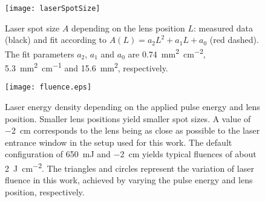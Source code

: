 \begin{figure}
    \centering
    \texttt{[image: laserSpotSize]}
    \caption{
        Laser spot size $A$ depending on the lens position $L$: measured data (black) and fit according to $A(L)=a_2L^2+a_1L+a_0$ (red dashed).
        The fit parameters $a_2$, $a_1$ and $a_0$ are \qty{0.74}{\mm\squared\per\cm\squared}, \qty{5.3}{\mm\squared\per\cm} and \qty{15.6}{\mm\squared}, respectively.
    }
    \label{Fig:Results_3_laserSpotSize}
\end{figure}
\begin{figure}
    \centering
    \texttt{[image: fluence.eps]}
    \caption{Laser energy density depending on the applied pulse energy and lens position. Smaller lens positions yield smaller spot sizes. A value of \qty{-2}{\cm} corresponds to the lens being as close as possible to the laser entrance window in the setup used for this work.
    The default configuration of \qty{650}{\milli\joule} and \qty{-2}{cm} yields typical fluences of about \qty{2}{\J\per\square\cm}.
    The triangles and circles represent the variation of laser fluence in this work, achieved by varying the pulse energy and lens position, respectively.}
    \label{Fig:Methods_fluence}
\end{figure}
